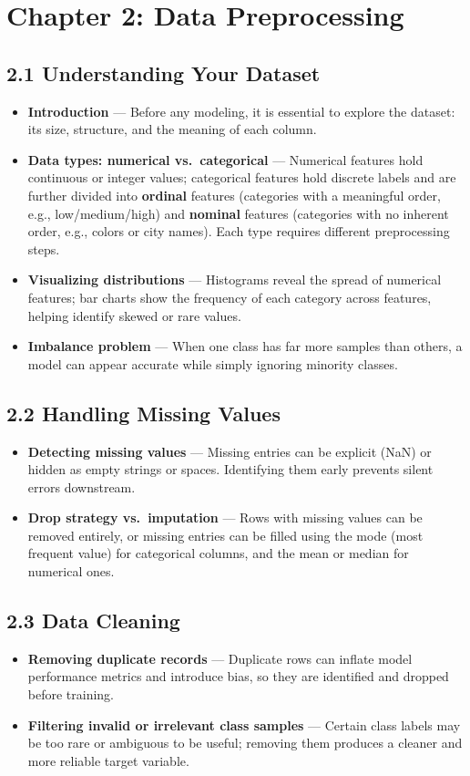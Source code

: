 \documentclass[12pt, a4paper]{article}
\begin{document}
\section*{Chapter 2: Data Preprocessing}

\subsection*{2.1 Understanding Your Dataset}
\begin{itemize}
    \item \textbf{Introduction} --- Before any modeling, it is essential to explore the dataset: its size, structure, and the meaning of each column.
    \item \textbf{Data types: numerical vs.\ categorical} --- Numerical features hold continuous or integer values; categorical features hold discrete labels and are further divided into \textbf{ordinal} features (categories with a meaningful order, e.g., low/medium/high) and \textbf{nominal} features (categories with no inherent order, e.g., colors or city names). Each type requires different preprocessing steps.
    \item \textbf{Visualizing distributions} --- Histograms reveal the spread of numerical features; bar charts show the frequency of each category across features, helping identify skewed or rare values.
    \item \textbf{Imbalance problem} --- When one class has far more samples than others, a model can appear accurate while simply ignoring minority classes.
\end{itemize}

\subsection*{2.2 Handling Missing Values}
\begin{itemize}
    \item \textbf{Detecting missing values} --- Missing entries can be explicit (NaN) or hidden as empty strings or spaces. Identifying them early prevents silent errors downstream.
    \item \textbf{Drop strategy vs.\ imputation} --- Rows with missing values can be removed entirely, or missing entries can be filled using the mode (most frequent value) for categorical columns, and the mean or median for numerical ones.
\end{itemize}

\subsection*{2.3 Data Cleaning}
\begin{itemize}
    \item \textbf{Removing duplicate records} --- Duplicate rows can inflate model performance metrics and introduce bias, so they are identified and dropped before training.
    \item \textbf{Filtering invalid or irrelevant class samples} --- Certain class labels may be too rare or ambiguous to be useful; removing them produces a cleaner and more reliable target variable.
\end{itemize}
\end{document}
